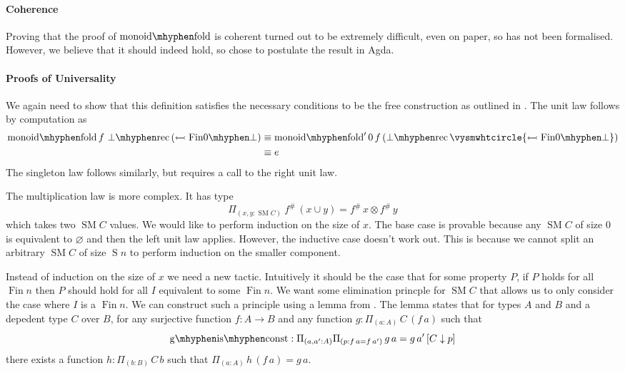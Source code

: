 \documentclass[12pt, parskip, DIV=14]{scrbook}
\renewcommand{\circ}{\vysmwhtcircle}
\newcommand{\SM}{\operatorname{SM}}
\newcommand{\Fin}{\operatorname{Fin}}
\newcommand{\Suc}{\operatorname{S}}
\newcommand{\monfold}{\operatorname{monoid\mhyphen fold}}
\newcommand{\botrec}{\operatorname{\bot\mhyphen rec}}
\newcommand{\finempty}{\operatorname{Fin0\mhyphen\bot}}
\begin{document}
\paragraph{Coherence}

Proving that the proof of $\monfold$ is coherent turned out to be extremely difficult, even on paper, so has not been formalised. However, we believe that it should indeed hold, so chose to postulate the result in Agda.

\paragraph{Proofs of Universality} We again need to show that this definition satisfies the necessary conditions to be the free construction as outlined in . The unit law follows by computation as
\begin{align*}
  \monfold f\,\botrec\,(\leftarrowtail \finempty) &\equiv \monfold' 0\,f\,(\botrec \circ {\leftarrowtail \finempty}) \\
  &\equiv e
\end{align*}
The singleton law follows similarly, but requires a call to the right unit law.

The multiplication law is more complex. It has type
$$\Pi_{(x , y : \SM C)}~f^\#\,(x \cup y) = f^\#\,x \otimes f^\#\,y$$
which takes two $\SM C$ values. We would like to perform induction on the size of $x$. The base case is provable because any $\SM C$ of size $0$ is equivalent to $\varnothing$ and then the left unit law applies. However, the inductive case doesn't work out. This is because we cannot split an arbitrary $\SM C$ of size $\Suc n$ to perform induction on the smaller component.

Instead of induction on the size of $x$ we need a new tactic. Intuitively it should be the case that for some property $P$, if $P$ holds for all $\Fin n$ then $P$ should hold for all $I$ equivalent to some $\Fin n$. We want some elimination princple for $\SM C$ that allows us to only consider the case where $I$ is a $\Fin n$. We can construct such a principle using a lemma from \citep{hou2017higher}. The lemma states that for types $A$ and $B$ and a depedent type $C$ over $B$, for any surjective function $f : A \to B$ and any function $g : \Pi_{(a : A)}\,C\,(f\,a)$ such that
$$\mathrm{g\mhyphen is\mhyphen const} : \Pi_{(a , a' : A)}\Pi_{(p : f\,a = f\,a')}\,g\,a = g\,a'\,[C \downarrow p]$$
there exists a function $h : \Pi_{(b : B)}\,C\,b$ such that $\Pi_{(a : A)}\,h\,(f\,a) = g\,a$.
\end{document}
